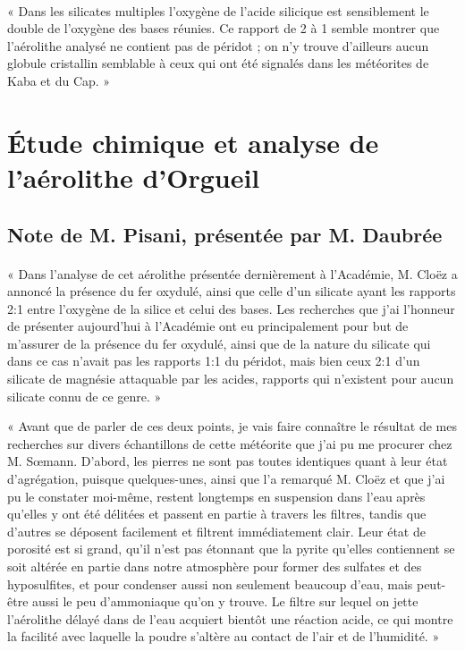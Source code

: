 \documentclass[a4paper, 11pt, oneside, polutonikogreek, french]{article}
\begin{document}
\paragraph{}
« Dans les silicates multiples l'oxygène de l'acide silicique est sensiblement le double de l'oxygène des bases réunies. Ce rapport de 2 à 1 semble montrer que l'aérolithe analysé ne contient pas de péridot ; on n'y trouve d'ailleurs aucun globule cristallin semblable à ceux qui ont été signalés dans les météorites de Kaba et du Cap. »
\clearpage
\section{Étude chimique et analyse de l'aérolithe d'Orgueil}
\subsection*{Note de M. Pisani, présentée par M. Daubrée}
\paragraph{}
« Dans l'analyse de cet aérolithe présentée dernièrement à l'Académie, M. Cloëz a annoncé la présence du fer oxydulé, ainsi que celle d'un silicate ayant les rapports 2:1 entre l'oxygène de la silice et celui des bases. Les recherches que j'ai l'honneur de présenter aujourd'hui à l'Académie ont eu principalement pour but de m'assurer de la présence du fer oxydulé, ainsi que de la nature du silicate qui dans ce cas n'avait pas les rapports 1:1 du péridot, mais bien ceux 2:1 d'un silicate de magnésie attaquable par les acides, rapports qui n'existent pour aucun silicate connu de ce genre. »

« Avant que de parler de ces deux points, je vais faire connaître le résultat de mes recherches sur divers échantillons de cette météorite que j'ai pu me procurer chez M. Sœmann. D'abord, les pierres ne sont pas toutes identiques quant à leur état d'agrégation, puisque quelques-unes, ainsi que l'a remarqué M. Cloëz et que j'ai pu le constater moi-même, restent longtemps en suspension dans l'eau après qu'elles y ont été délitées et passent en partie à travers les filtres, tandis que d'autres se déposent facilement et filtrent immédiatement clair. Leur état de porosité est si grand, qu'il n'est pas étonnant que la pyrite qu'elles contiennent se soit altérée en partie dans notre atmosphère pour former des sulfates et des hyposulfites, et pour condenser aussi non seulement beaucoup d'eau, mais peut-être aussi le peu d'ammoniaque qu'on y trouve. Le filtre sur lequel on jette l'aérolithe délayé dans de l'eau acquiert bientôt une réaction acide, ce qui montre la facilité avec laquelle la poudre s'altère au contact de l'air et de l'humidité. »
\end{document}
